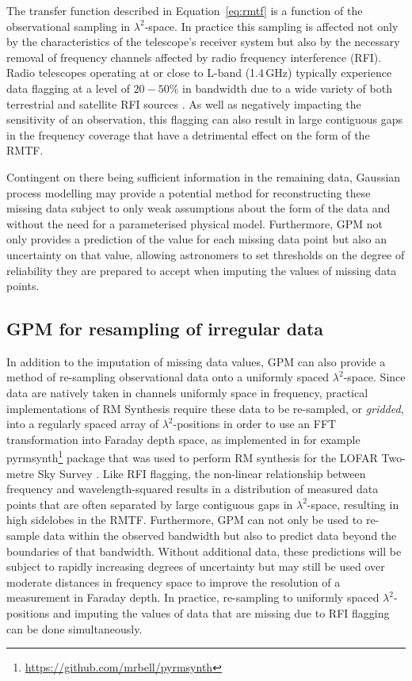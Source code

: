 \documentclass[fleqn,usenatbib]{mnras}
\begin{document}
The transfer function described in Equation~\ref{eq:rmtf} is a function of the observational sampling in $\lambda^2$-space. In practice this sampling is affected not only by the characteristics of the telescope's receiver system but also by the necessary removal of frequency channels affected by radio frequency interference (RFI). Radio telescopes operating at or close to L-band (1.4\,GHz) typically experience data flagging at a level of $20-50\%$ in bandwidth due to a wide variety of both terrestrial and satellite RFI sources \citep[e.g.][]{deep2}. As well as negatively impacting the sensitivity of an observation, this flagging can also result in large contiguous gaps in the frequency coverage that have a detrimental effect on the form of the RMTF.

Contingent on there being sufficient information in the remaining data, Gaussian process modelling may provide a potential method for reconstructing these missing data subject to only weak assumptions about the form of the data and without the need for a parameterised physical model. Furthermore, GPM not only provides a prediction of the value for each missing data point but also an uncertainty on that value, allowing astronomers to set thresholds on the degree of reliability they are prepared to accept when imputing the values of missing data points.

\subsection{GPM for resampling of irregular data}
\label{sec:resampling}

In addition to the imputation of missing data values, GPM can also provide a method of re-sampling observational data onto a uniformly spaced $\lambda^2$-space. Since data are natively taken in channels uniformly space in frequency, practical implementations of RM Synthesis require these data to be re-sampled, or {\it gridded}, into a regularly spaced array of $\lambda^2$-positions in order to use an FFT transformation into Faraday depth space, as implemented in for example {\sc pyrmsynth}\footnote{\url{https://github.com/mrbell/pyrmsynth}} package that was used to perform RM synthesis for the LOFAR Two-metre Sky Survey \citep{lofarpyrmsynth}. Like RFI flagging, the non-linear relationship between frequency and wavelength-squared results in a distribution of measured data points that are often separated by large contiguous gaps in $\lambda^2$-space, resulting in high sidelobes in the RMTF. Furthermore, GPM can not only be used to re-sample data within the observed bandwidth but also to predict data beyond the boundaries of that bandwidth. Without additional data, these predictions will be subject to rapidly increasing degrees of uncertainty but may still be used over moderate distances in frequency space to improve the resolution of a measurement in Faraday depth. In practice, re-sampling to uniformly spaced $\lambda^2$-positions and imputing the values of data that are missing due to RFI flagging can be done simultaneously.
\end{document}
